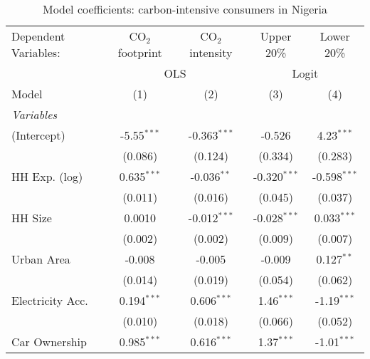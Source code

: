 
\begin{table}[htbp!]
   \centering
   \small
   \begin{adjustbox}{width = 1\textwidth, max height = 0.95\textheight, center}
      \begin{threeparttable}[b]
         \caption{\label{tab:Logit_1_NGA} Model coefficients: carbon-intensive consumers in Nigeria}
         \begin{tabular}{lcccc}
            \tabularnewline \midrule \midrule
            Dependent Variables: & CO$_{2}$ footprint & CO$_{2}$ intensity & Upper 20\%     & Lower 20\%\\   
             & \multicolumn{2}{c}{OLS} & \multicolumn{2}{c}{Logit} \\ 
            Model                & (1)                & (2)                & (3)            & (4)\\  
            \midrule
            \emph{Variables}\\
            (Intercept)          & -5.55$^{***}$      & -0.363$^{***}$     & -0.526         & 4.23$^{***}$\\   
                                 & (0.086)            & (0.124)            & (0.334)        & (0.283)\\   
            HH Exp. (log)        & 0.635$^{***}$      & -0.036$^{**}$      & -0.320$^{***}$ & -0.598$^{***}$\\   
                                 & (0.011)            & (0.016)            & (0.045)        & (0.037)\\   
            HH Size              & 0.0010             & -0.012$^{***}$     & -0.028$^{***}$ & 0.033$^{***}$\\   
                                 & (0.002)            & (0.002)            & (0.009)        & (0.007)\\   
            Urban Area           & -0.008             & -0.005             & -0.009         & 0.127$^{**}$\\   
                                 & (0.014)            & (0.019)            & (0.054)        & (0.062)\\   
            Electricity Acc.     & 0.194$^{***}$      & 0.606$^{***}$      & 1.46$^{***}$   & -1.19$^{***}$\\   
                                 & (0.010)            & (0.018)            & (0.066)        & (0.052)\\   
            Car Ownership        & 0.985$^{***}$      & 0.616$^{***}$      & 1.37$^{***}$   & -1.01$^{***}$\\   

\end{tabular}
\end{threeparttable}
\end{adjustbox}
\end{table}
